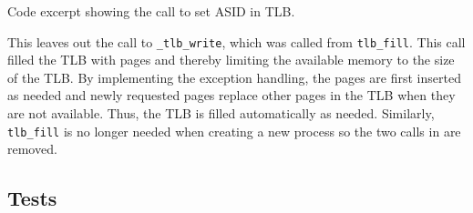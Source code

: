 {Code excerpt showing the call to set ASID in TLB.}

This leaves out the call to \verb|_tlb_write|, which was called from
\verb|tlb_fill|. This call filled the TLB with pages and thereby limiting the
available memory to the size of the TLB. By implementing the exception handling,
the pages are first inserted as needed and newly requested pages replace other
pages in the TLB when they are not available. Thus, the TLB is filled
automatically as needed. Similarly, \verb|tlb_fill| is no longer needed when
creating a new process so the two calls in  are removed.


\subsection{Tests}

